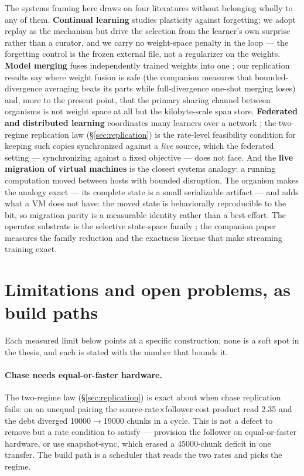 \documentclass[11pt]{article}
\theoremstyle{definition}
\begin{document}
The systems framing here draws on four literatures without belonging wholly to
any of them. \textbf{Continual learning} studies plasticity against forgetting;
we adopt replay as the mechanism \cite{vandeven2019replay} but drive the
selection from the learner's own surprise rather than a curator, and we carry
no weight-space penalty \cite{kirkpatrick2017ewc} in the loop --- the
forgetting control is the frozen external file, not a regularizer on the
weights. \textbf{Model merging} fuses independently trained weights into one
\cite{wortsman2022modelsoups, matena2022merging}; our replication results say
where weight fusion is safe (the companion measures that bounded-divergence
averaging beats its parts while full-divergence one-shot merging loses) and,
more to the present point, that the primary sharing channel between organisms
is not weight space at all but the kilobyte-scale span store.
\textbf{Federated and distributed learning} coordinates many learners over a
network \cite{mcmahan2017fedavg}; the two-regime replication law
(\S\ref{sec:replication}) is the rate-level feasibility condition for keeping
such copies synchronized against a \emph{live} source, which the federated
setting --- synchronizing against a fixed objective --- does not face. And the
\textbf{live migration of virtual machines} \cite{clark2005livemigration} is
the closest systems analogy: a running computation moved between hosts with
bounded disruption. The organism makes the analogy exact --- its complete state
is a small serializable artifact --- and adds what a VM does not have: the moved
state is behaviorally reproducible to the bit, so migration parity is a
measurable identity rather than a best-effort. The operator substrate is the
selective state-space family \cite{gu2023mamba}; the companion paper measures
the family reduction and the exactness license that make streaming training
exact.

\section{Limitations and open problems, as build paths}
\label{sec:limits}

Each measured limit below points at a specific construction; none is a soft
spot in the thesis, and each is stated with the number that bounds it.

\paragraph{Chase needs equal-or-faster hardware.} The two-regime law
(\S\ref{sec:replication}) is exact about when chase replication fails: on an
unequal pairing the source-rate$\times$follower-cost product read \num{2.35} and
the debt diverged \num{10000}$\to$\num{19000} chunks in a cycle. This is not a
defect to remove but a rate condition to satisfy --- provision the follower on
equal-or-faster hardware, or use snapshot-sync, which erased a \num{45000}-chunk
deficit in one transfer. The build path is a scheduler that reads the two rates
and picks the regime.
\end{document}
